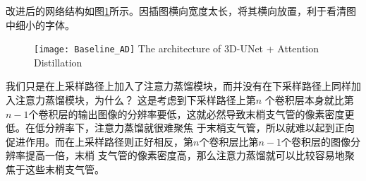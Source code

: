改进后的网络结构如图\ref{fig:3dunet_ad}所示。因插图横向宽度太长，将其横向放置，利于看清图中细小的字体。
\begin{figure}[!ht]
    \centering
    \texttt{[image: Baseline\_AD]}
        {The architecture of 3D-UNet + Attention Distillation}
    \label{fig:3dunet_ad}
\end{figure}
我们只是在上采样路径上加入了注意力蒸馏模块，而并没有在下采样路径上同样加入注意力蒸馏模块，为什么？ 这是考虑到下采样路径上第$n$
个卷积层本身就比第$n-1$个卷积层的输出图像的分辨率要低，这就必然导致末梢支气管的像素密度更低。在低分辨率下，注意力蒸馏就很难聚焦
于末梢支气管，所以就难以起到正向促进作用。而在上采样路径则正好相反，第$n$个卷积层比第$n-1$个卷积层的图像分辨率提高一倍，末梢
支气管的像素密度高，那么注意力蒸馏就可以比较容易地聚焦于这些末梢支气管。

